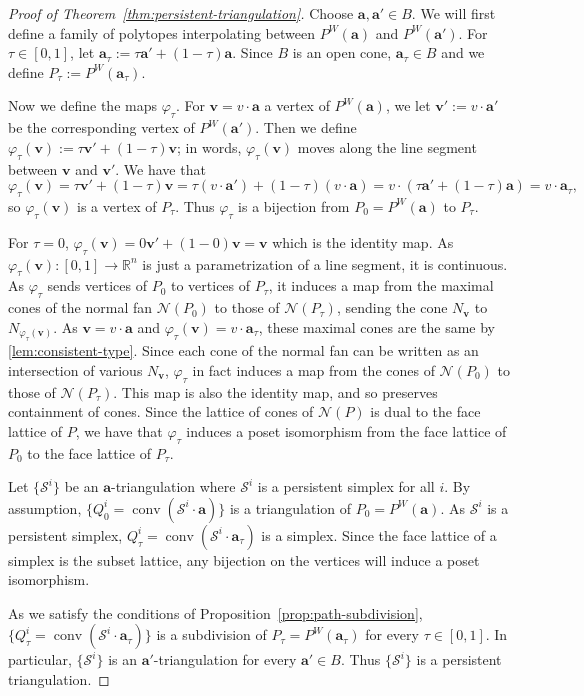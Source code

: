 \documentclass{amsart}
\theoremstyle{definition}
\newcommand{\bR}{\mathbb{R}}
\def\ba{\mathbf{a}}
\def\bv{\mathbf{v}}
\def\wperm_#1{P^W(#1)}
\def\cS{\mathcal{S}}
\DeclareMathOperator{\conv}{conv}
\begin{document}
\begin{proof}[Proof of Theorem~\ref{thm:persistent-triangulation}]

Choose $\ba,\ba'\in B$. We will first define a family of polytopes interpolating between $\wperm_{\ba}$ and $\wperm_{\ba'}$. For $\tau \in [0,1]$, let $\ba_\tau :=\tau\ba'+(1-\tau)\ba$. Since $B$ is an open cone, $\ba_\tau\in B$ and we define $P_\tau:=\wperm_{\ba_\tau}$.

Now we define the maps $\varphi_\tau$. For $\bv=v \cdot \ba$ a vertex of $\wperm_\ba$, we let $\bv':=v \cdot \ba'$ be the corresponding vertex of $\wperm_{\ba'}$. Then we define $\varphi_\tau(\bv):=\tau \bv'+(1-\tau)\bv$; in words, $\varphi_\tau(\bv)$ moves along the line segment between $\bv$ and $\bv'$. We have that 
\[\varphi_\tau(\bv)=\tau \bv'+(1-\tau)\bv=\tau (v\cdot\ba')+(1-\tau)(v\cdot\ba)=v\cdot(\tau\ba'+(1-\tau)\ba)=v\cdot\ba_\tau,\] 
so $\varphi_\tau(\bv)$ is a vertex of $P_\tau$. Thus $\varphi_\tau$ is a bijection from $P_0=\wperm_\ba$ to $P_\tau$.

For $\tau=0$, $\varphi_\tau(\bv)=0\bv'+(1-0)\bv=\bv$ which is the identity map. As $\varphi_\tau(\bv):[0,1] \to \bR^n$ is just a parametrization of a line segment, it is continuous.
As $\varphi_\tau$ sends vertices of $P_0$ to vertices of $P_\tau$, it induces a map from the maximal cones of the normal fan $\mathcal{N}(P_0)$ to those of $\mathcal{N}(P_\tau)$, sending the cone $N_{\bv}$ to $N_{\varphi_\tau(\bv)}$. As $\bv=v\cdot \ba$ and $\varphi_\tau(\bv)=v\cdot\ba_\tau$, these maximal cones are the same by \cref{lem:consistent-type}. Since each cone of the normal fan can be written as an intersection of various $N_{\bv}$, $\varphi_\tau$ in fact induces a map from the cones of $\mathcal{N}(P_0)$ to those of $\mathcal{N}(P_\tau)$. This map is also the identity map, and so preserves containment of cones. Since the lattice of cones of $\mathcal{N}(P)$ is dual to the face lattice of $P$, we have that $\varphi_\tau$ induces a poset isomorphism from the face lattice of $P_0$ to the face lattice of $P_\tau$.

Let $\{\cS^i\}$ be an $\ba$-triangulation where $\cS^i$ is a persistent simplex for all $i$. By assumption, $\{Q_0^i=\conv(\cS^i\cdot\ba)\}$ is a triangulation of $P_0=\wperm_\ba$. As $\cS^i$ is a persistent simplex, $Q_\tau^i=\conv(\cS^i\cdot \ba_\tau)$ is a simplex. Since the face lattice of a simplex is the subset lattice, any bijection on the vertices will induce a poset isomorphism.

As we satisfy the conditions of Proposition~\ref{prop:path-subdivision}, $\{Q_\tau^i=\conv(\cS^i\cdot \ba_\tau)\}$ is a subdivision of $P_\tau=\wperm_{\ba_\tau}$ for every $\tau\in[0,1]$. In particular, $\{\cS^i\}$ is an $\ba'$-triangulation for every $\ba'\in B$. Thus $\{\cS^i\}$ is a persistent triangulation.
\end{proof}
\end{document}
